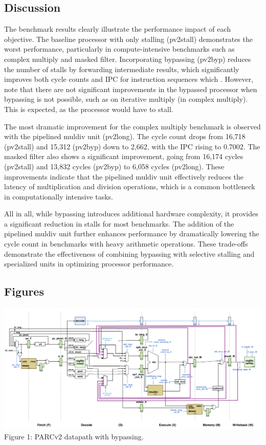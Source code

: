 \documentclass[12pt]{article}
\begin{document}
\subsection*{Discussion}

The benchmark results clearly illustrate the performance impact of each
objective. The baseline processor with only stalling (pv2stall) demonstrates the
worst performance, particularly in compute-intensive benchmarks such as complex
multiply and masked filter. Incorporating bypassing (pv2byp) reduces the number
of stalls by forwarding intermediate results, which significantly improves both cycle counts
and IPC for instruction sequences which . However, note that there are not significant improvements
in the bypassed processor when bypassing is not possible, such as on iterative multiply (in complex multiply).
This is expected, as the processor would have to stall.

The most dramatic improvement for the complex multiply benchmark is observed with the pipelined muldiv unit
(pv2long). The cycle count drops from 16,718
(pv2stall) and 15,312 (pv2byp) down to 2,662, with the IPC rising to 0.7002.
The masked filter also shows a significant improvement, going from 16,174
cycles (pv2stall) and 13,832 cycles (pv2byp) to 6,058 cycles (pv2long). These
improvements indicate that the pipelined muldiv unit effectively reduces the
latency of multiplication and division operations, which is a common bottleneck in
computationally intensive tasks.

All in all, while bypassing introduces additional hardware complexity, it
provides a significant reduction in stalls for most benchmarks. The addition of
the pipelined muldiv unit further enhances performance by dramatically lowering
the cycle count in benchmarks with heavy arithmetic operations. These
trade-offs demonstrate the effectiveness of combining bypassing with selective
stalling and specialized units in optimizing processor performance.

\subsection*{Figures}

\begin{center}
\includegraphics[scale=0.32]{../lab2_bypdpath.png}
Figure 1: PARCv2 datapath with bypassing.
\end{center}
\end{document}
